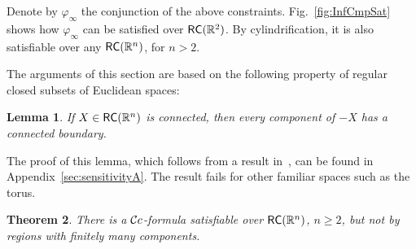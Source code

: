 \documentclass{article}
\newtheorem{theorem}{Theorem}
\newtheorem{lemma}[theorem]{Lemma}
\newcommand{\R}{\mathbb{R}}
\newcommand{\RC}{{\sf RC}}
\renewcommand{\phi}{\varphi}
\begin{document}
Denote by $\phi_\infty$ the conjunction of the above
constraints. Fig.~\ref{fig:InfCmpSat} shows how $\phi_\infty$ can be
satisfied over $\RC(\R^2)$. By cylindrification, it is also satisfiable
over any $\RC(\R^n)$, for $n> 2$.

The arguments of this section are based on the following
property of regular closed subsets of Euclidean spaces:
\begin{lemma}\label{lma:ourNewman}
If $X \in \RC(\R^n)$ is connected, then every component of $-X$ 
has a connected boundary.
\end{lemma}

The proof of this lemma, which follows from a result
in~\cite{ijcai:Newman64}, can be found in Appendix~\ref{sec:sensitivityA}. 
The result fails for other familiar spaces such as the torus.
\begin{theorem}\label{theo:inftyCc}
There is a $\mathcal{C}c$-formula 
satisfiable over $\RC(\R^n)$, $n
\geq 2$, but not by regions with finitely many components.
\end{theorem}
\end{document}
